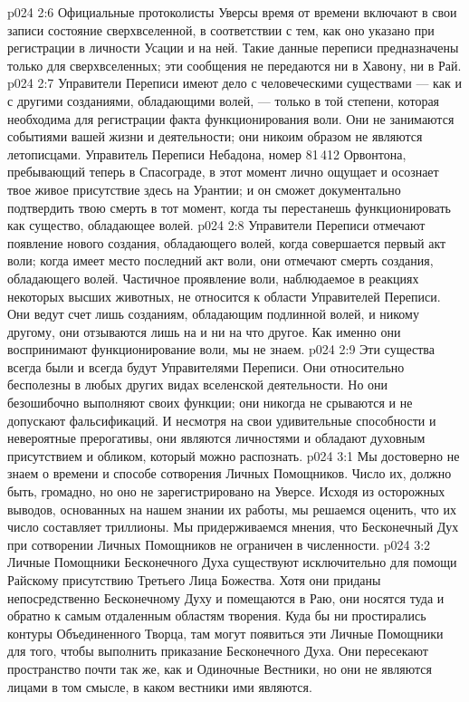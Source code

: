 \vs p024 2:6 Официальные протоколисты Уверсы время от времени включают в свои записи состояние сверхвселенной, в соответствии с тем, как оно указано при регистрации в личности Усации и на ней. Такие данные переписи предназначены только для сверхвселенных; эти сообщения не передаются ни в Хавону, ни в Рай.
\vs p024 2:7 \pc Управители Переписи имеют дело с человеческими существами --- как и с другими созданиями, обладающими волей, --- только в той степени, которая необходима для регистрации факта функционирования воли. Они не занимаются событиями вашей жизни и деятельности; они никоим образом не являются летописцами. Управитель Переписи Небадона, номер 81\,412 Орвонтона, пребывающий теперь в Спасограде, в этот момент лично ощущает и осознает твое живое присутствие здесь на Урантии; и он сможет документально подтвердить твою смерть в тот момент, когда ты перестанешь функционировать как существо, обладающее волей.
\vs p024 2:8 Управители Переписи отмечают появление нового создания, обладающего волей, когда совершается первый акт воли; когда имеет место последний акт воли, они отмечают смерть создания, обладающего волей. Частичное проявление воли, наблюдаемое в реакциях некоторых высших животных, не относится к области Управителей Переписи. Они ведут счет лишь созданиям, обладающим подлинной волей, и никому другому, они отзываются лишь на  и ни на что другое. Как именно они воспринимают функционирование воли, мы не знаем.
\vs p024 2:9 Эти существа всегда были и всегда будут Управителями Переписи. Они относительно бесполезны в любых других видах вселенской деятельности. Но они безошибочно выполняют своих функции; они никогда не срываются и не допускают фальсификаций. И несмотря на свои удивительные способности и невероятные прерогативы, они являются личностями и обладают духовным присутствием и обликом, который можно распознать.
\vs p024 3:1 Мы достоверно не знаем о времени и способе сотворения Личных Помощников. Число их, должно быть, громадно, но оно не зарегистрировано на Уверсе. Исходя из осторожных выводов, основанных на нашем знании их работы, мы решаемся оценить, что их число составляет триллионы. Мы придерживаемся мнения, что Бесконечный Дух при сотворении Личных Помощников не ограничен в численности.
\vs p024 3:2 Личные Помощники Бесконечного Духа существуют исключительно для помощи Райскому присутствию Третьего Лица Божества. Хотя они приданы непосредственно Бесконечному Духу и помещаются в Раю, они носятся туда и обратно к самым отдаленным областям творения. Куда бы ни простирались контуры Объединенного Творца, там могут появиться эти Личные Помощники для того, чтобы выполнить приказание Бесконечного Духа. Они пересекают пространство почти так же, как и Одиночные Вестники, но они не являются лицами в том смысле, в каком вестники ими являются.
